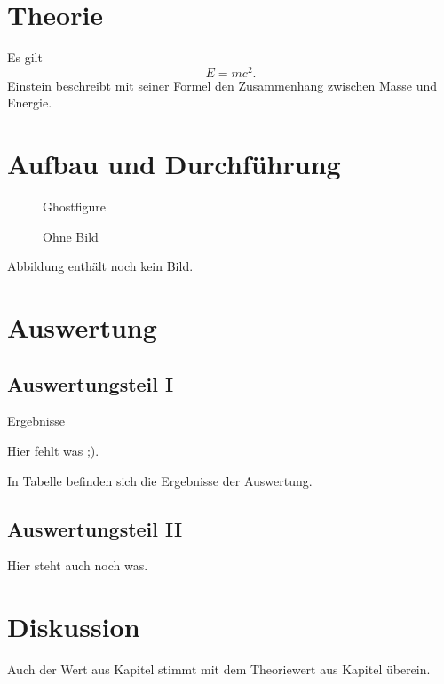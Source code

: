 \documentclass[
  captions=tableheading,
]{scrartcl}
\begin{document}
\section{Theorie}

Es gilt
\begin{equation}
  E = mc^2 .
\end{equation}
Einstein beschreibt mit seiner Formel den Zusammenhang zwischen Masse und Energie.

\section{Aufbau und Durchführung}

\begin{figure}
  \centering
  Ghostfigure
  \caption{Ohne Bild}
\end{figure}
Abbildung enthält noch kein Bild.

\section{Auswertung}

\subsection{Auswertungsteil I}

\begin{table}
  \centering
  \caption{Ergebnisse}
  Hier fehlt was ;).
\end{table}
In Tabelle befinden sich die Ergebnisse der Auswertung.

\subsection{Auswertungsteil II}

Hier steht auch noch was.

\section{Diskussion}

Auch der Wert aus Kapitel stimmt mit dem Theoriewert aus Kapitel überein.
\end{document}
